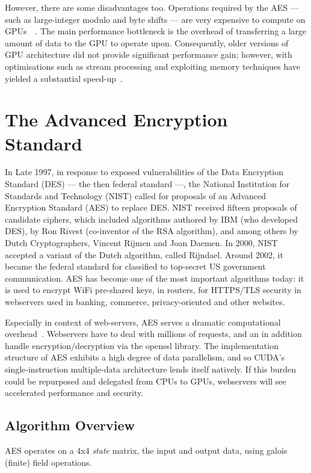 \documentclass[letterpaper,twocolumn,10pt]{article}
\begin{document}
However, there are some disadvantages too.
Operations required by the AES --- such as large-integer modulo and byte shifts --- are very expensive to compute on GPUs~\cite{cuda_pro_guide}~\cite{modulo_error}.
The main performance bottleneck is the overhead of transferring a large amount of data to the GPU to operate upon.
Consequently, older versions of GPU architecture did not provide significant performance gain; however, with optimisations such as stream processing and exploiting memory techniques have yielded a substantial speed-up~\cite{iwai}.

\section{The Advanced Encryption Standard}
In Late 1997, in response to exposed vulnerabilities of the Data Encryption Standard (DES) --- the then federal standard ---, the National Institution for Standards and Technology (NIST) called for proposals of an Advanced Encryption Standard (AES) to replace DES.
NIST received fifteen proposals of candidate ciphers, which included algorithms authored by IBM (who developed DES), by Ron Rivest (co-inventor of the RSA algorithm), and among others by Dutch Cryptographers, Vincent Rijmen and Joan Daemen.
In 2000, NIST accepted a variant of the Dutch algorithm, called Rijndael.
Around 2002, it became the federal standard for classified to top-secret US government communication.
AES has become one of the most important algorithms today: it is used to encrypt WiFi pre-shared keys, in routers, for HTTPS/TLS security in webservers used in banking, commerce, privacy-oriented and other websites.

Especially in context of web-servers, AES serves a dramatic computational overhead~\cite{ieee_cuda}. Webservers have to deal with millions of requests, and an in addition handle encryption/decryption via the openssl library.
The implementation structure of AES exhibits a high degree of data parallelism, and so CUDA's single-instruction multiple-data architecture lends itself natively.
If this burden could be repurposed and delegated from CPUs to GPUs, webservers will see accelerated performance and security.

\subsection{Algorithm Overview}
AES operates on a 4x4 \textit{state} matrix, the input and output data, using galois (finite) field operations.
\end{document}

